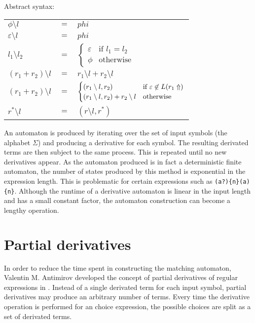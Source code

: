\begin{defn}
   \label{defn-deriv}
   Abstract syntax:

   \begin{tabular}{lrl}
      $\phi \setminus l$	& $=$	& $phi$	\\
      $\varepsilon \setminus l$	& $=$	& $phi$	\\
      $l_1 \setminus l_2$	& $=$	&
          $\begin{cases}
             \varepsilon & \text{if } l_1 = l_2 \\
             \phi & \text{otherwise}
          \end{cases}$	\\
      $(r_1 + r_2) \setminus l$	& $=$	& $r_1 \setminus l + r_2 \setminus l$	\\
      $(r_1 + r_2) \setminus l$	& $=$	&
          $\begin{cases}
             (r_1 \setminus l, r_2) & \text{if } \varepsilon \not\in L(r_1\Uparrow) \\
             (r_1 \setminus l, r_2) + r_2 \setminus l & \text{otherwise}
          \end{cases}$	\\
      $r^* \setminus l$		& $=$	& $(r \setminus l, r^*)$	\\
   \end{tabular}
\end{defn}

An automaton is produced by iterating over the set of input symbols (the
alphabet $\Sigma$) and producing a derivative for each symbol. The resulting
derivated terms are then subject to the same process. This is repeated until no
new derivatives appear. As the automaton produced is in fact a deterministic
finite automaton, the number of states produced by this method is exponential in
the expression length. This is problematic for certain expressions such as
\verb!(a?){n}(a){n}!. Although the runtime of a derivative automaton is linear
in the input length and has a small constant factor, the automaton construction
can become a lengthy operation.


\section{Partial derivatives}
\label{pd}

In order to reduce the time spent in constructing the matching automaton,
Valentin M. Antimirov developed the concept of partial derivatives of regular
expressions in \cite{antimirov}. Instead of a single derivated term for each
input symbol, partial derivatives may produce an arbitrary number of terms.
Every time the derivative operation is performed for an choice expression, the
possible choices are split as a set of derivated terms.

